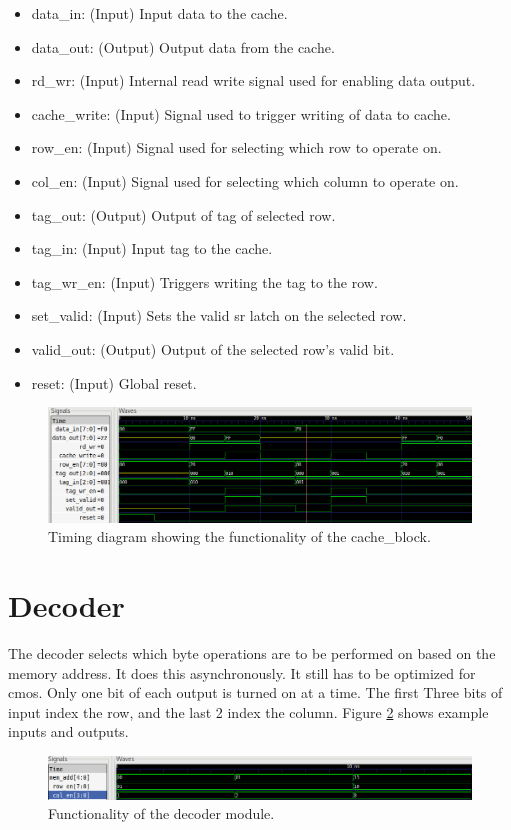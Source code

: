 \documentclass[10pt]{article}
\begin{document}
\begin{itemize}
    \item data_in: (Input) Input data to the cache.
    \item data_out: (Output) Output data from the cache.
    \item rd_wr: (Input) Internal read write signal used for enabling data
output.
    \item cache_write: (Input) Signal used to trigger writing of data to cache.
    \item row_en: (Input) Signal used for selecting which row to operate on.
    \item col_en: (Input) Signal used for selecting which column to operate on.
    \item tag_out: (Output) Output of tag of selected row.
    \item tag_in: (Input) Input tag to the cache.
    \item tag_wr_en: (Input) Triggers writing the tag to the row.
    \item set_valid: (Input) Sets the valid sr latch on the selected row.
    \item valid_out: (Output) Output of the selected row's valid bit.
    \item reset: (Input) Global reset.
\end{itemize}
\begin{figure}[!htb]
    \centering
    \includegraphics[width=\textwidth]{cb.png}
    \caption{Timing diagram showing the functionality of the cache_block.}
    \label{cb}
\end{figure}
\section{Decoder}
The decoder selects which byte operations are to be performed on based on the
memory address. It does this asynchronously. It still has to be optimized for
cmos. Only one bit of each output is turned on at a time. The first Three bits
of input index the row, and the last 2 index the column. Figure \ref{d} shows
example inputs and outputs.  
\begin{figure}[!htb] 
    \centering
    \includegraphics[width=\textwidth]{d.png}
    \caption{Functionality of the decoder module.}
    \label{d}
\end{figure}
\end{document}
